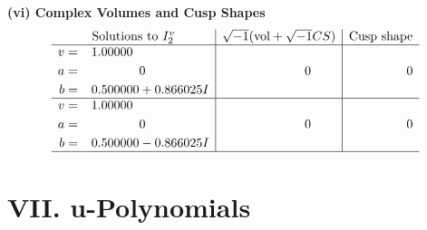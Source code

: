 \documentclass[1p]{elsarticle_modified}
\theoremstyle{definition}
\newcommand{\I}{\sqrt{-1}}
\begin{document}
\newpage\flushleft \textbf{(vi) Complex Volumes and Cusp Shapes}
$$\begin{array}{c|c|c}  
\text{Solutions to }I^v_{2}& \I (\text{vol} + \sqrt{-1}CS) & \text{Cusp shape}\\
 \hline 
\begin{aligned}
v &= \phantom{-}1.00000\phantom{ +0.000000I} \\
a &= \phantom{-0.000000 } 0 \\
b &= \phantom{-}0.500000 + 0.866025 I\end{aligned}
 & \phantom{-0.000000 } 0 & \phantom{-0.000000 } 0 \\ \hline\begin{aligned}
v &= \phantom{-}1.00000\phantom{ +0.000000I} \\
a &= \phantom{-0.000000 } 0 \\
b &= \phantom{-}0.500000 - 0.866025 I\end{aligned}
 & \phantom{-0.000000 } 0 & \phantom{-0.000000 } 0\\
 \hline 
 \end{array}$$\newpage
\newpage\renewcommand{\arraystretch}{1}
\centering \section*{ VII. u-Polynomials}
\end{document}

